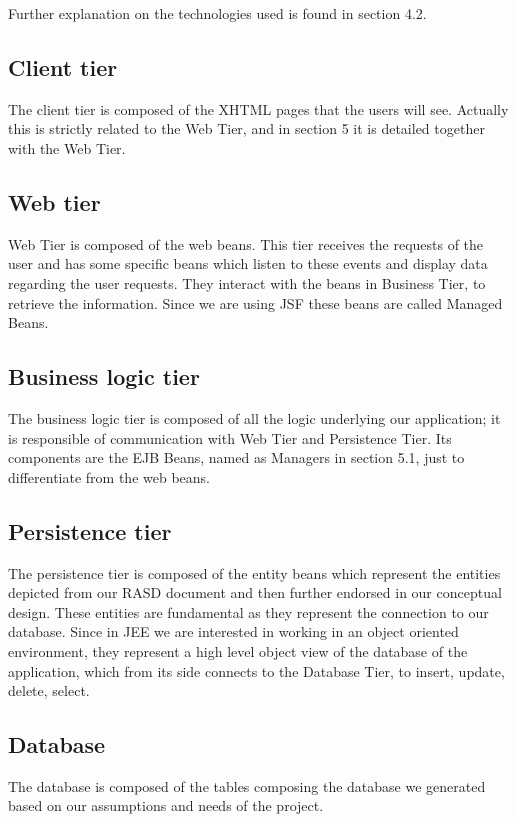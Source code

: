 \documentclass[a4paper,12pt]{book}
\begin{document}
Further explanation on the technologies used is found in section 4.2.

\subsection{Client tier}
The client tier is composed of the XHTML pages that the users will see. Actually this is strictly related to the Web Tier, and in section 5 it is detailed together with the Web Tier.

\subsection{Web tier}
Web Tier is composed of the web beans. This tier receives the requests of the user and has some specific beans which listen to these events and display data regarding the user requests. They interact with the beans in Business Tier, to retrieve the information. Since we are using JSF these beans are called Managed Beans.

\subsection{Business logic tier}
The business logic tier is composed of all the logic underlying our application; it is responsible of communication with Web Tier and Persistence Tier. Its components are the EJB Beans, named as Managers in section 5.1, just to differentiate from the web beans.

\subsection{Persistence tier}
The persistence tier is composed of the entity beans which represent the entities depicted from our RASD document and then further endorsed in our conceptual design. These entities are fundamental as they represent the connection to our database. Since in JEE we are interested in working in an object oriented environment, they represent a high level object view of the database of the application, which from its side connects to the Database Tier, to insert, update, delete, select.

\subsection{Database}
The database is composed of the tables composing the database we generated based on our assumptions and needs of the project.
\end{document}
